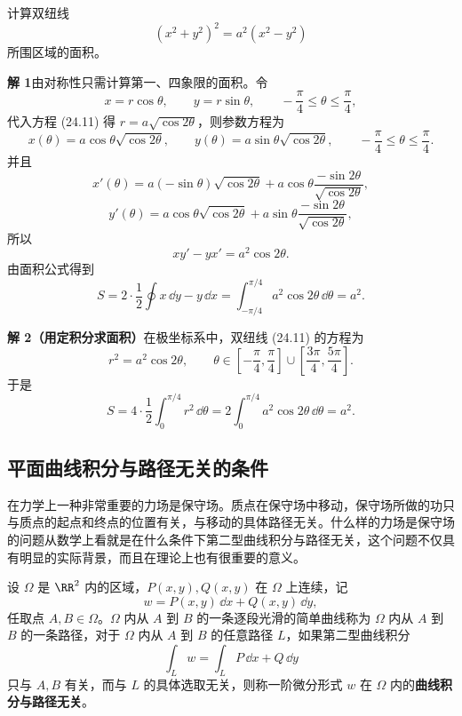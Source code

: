 \begin{xexample}[24.3.4]
计算双纽线
\begin{equation}
  (x^2+y^2)^2=a^2(x^2-y^2)
  \tag{24.11}
  \label{eq:24.11}
\end{equation}
所围区域的面积。
\end{xexample}
\begin{xsolution}
\textbf{解 1}\quad 由对称性只需计算第一、四象限的面积。令
\[
  x=r\cos\theta,\qquad y=r\sin\theta,\qquad -\frac\pi4\le\theta\le\frac\pi4,
\]
代入方程 (24.11) 得 $r=a\sqrt{\cos2\theta}$，则参数方程为
\[
  x(\theta)=a\cos\theta\sqrt{\cos2\theta},\qquad
  y(\theta)=a\sin\theta\sqrt{\cos2\theta},\qquad
  -\frac\pi4\le\theta\le\frac\pi4.
\]
并且
\[
  x'(\theta)=a(-\sin\theta)\sqrt{\cos2\theta}+a\cos\theta\frac{-\sin2\theta}{\sqrt{\cos2\theta}},
\]
\[
  y'(\theta)=a\cos\theta\sqrt{\cos2\theta}+a\sin\theta\frac{-\sin2\theta}{\sqrt{\cos2\theta}},
\]
所以
\[
  xy'-yx'=a^2\cos2\theta.
\]
由面积公式得到
\[
  S=2\cdot\frac12\oint x\,\dd y-y\,\dd x
  =\int_{-\pi/4}^{\pi/4}a^2\cos2\theta\,\dd\theta=a^2.
\]

\textbf{解 2（用定积分求面积）}\quad 在极坐标系中，双纽线 (24.11) 的方程为
\[
  r^2=a^2\cos2\theta,\qquad
  \theta\in\left[-\frac\pi4,\frac\pi4\right]\cup\left[\frac{3\pi}4,\frac{5\pi}4\right].
\]
于是
\[
  S=4\cdot\frac12\int_0^{\pi/4}r^2\,\dd\theta
  =2\int_0^{\pi/4}a^2\cos2\theta\,\dd\theta=a^2.
\]
\end{xsolution}

\subsection{平面曲线积分与路径无关的条件}

在力学上一种非常重要的力场是保守场。质点在保守场中移动，保守场所做的功只与质点的起点和终点的位置有关，与移动的具体路径无关。什么样的力场是保守场的问题从数学上看就是在什么条件下第二型曲线积分与路径无关，这个问题不仅具有明显的实际背景，而且在理论上也有很重要的意义。

设 $\Omega$ 是 $\RR^2$ 内的区域，$P(x,y),Q(x,y)$ 在 $\Omega$ 上连续，记
\[
  w=P(x,y)\,\dd x+Q(x,y)\,\dd y,
\]
任取点 $A,B\in\Omega$。$\Omega$ 内从 $A$ 到 $B$ 的一条逐段光滑的简单曲线称为 $\Omega$ 内从 $A$ 到 $B$ 的一条路径，对于 $\Omega$ 内从 $A$ 到 $B$ 的任意路径 $L$，如果第二型曲线积分
\[
  \int_Lw=\int_LP\,\dd x+Q\,\dd y
\]
只与 $A,B$ 有关，而与 $L$ 的具体选取无关，则称一阶微分形式 $w$ 在 $\Omega$ 内的\textbf{曲线积分与路径无关}。


